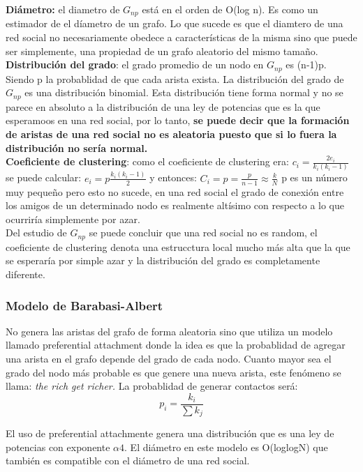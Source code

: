 \documentclass[titlepage,a4paper]{article}
\begin{document}
\textbf{Diámetro:} el diametro de $G_{np}$ está en el orden de O(log n). Es como un estimador de el díametro de un grafo. Lo que sucede es que el diamtero de una red social no necesariamente obedece a características de la misma sino que puede ser simplemente, una propiedad de un grafo aleatorio del mismo tamaño. \\

\textbf{Distribución del grado}: el grado promedio de un nodo en $G_{np}$ es (n-1)p. Siendo p la probablidad de que cada arista exista. La distribución del grado de $G_{np}$ es una distribución binomial. Esta distribución tiene forma normal y no se parece en absoluto a la distribución de una ley de potencias que es la que esperamoos en una red social, por lo tanto, \textbf{se puede decir que la formación de aristas de una red social  no es aleatoria puesto que si lo fuera la distribución no sería normal.}\\

\textbf{Coeficiente de clustering}: como el coeficiente de clustering era: $c_i = \frac{2e_i}{k_i(k_i-1)}$ se puede calcular: $e_i = p \frac{k_i(k_i-1)}{2}$ y entonces: $C_i = p =\frac{p}{n-1} \approx \frac{k}{N}$ p es un número muy pequeño pero esto no sucede, en una red social el grado de conexión entre los amigos de un determinado nodo es realmente altísimo con respecto a lo que ocurriría simplemente por azar. \\

Del estudio de $G_{np}$ se puede concluir que una red social no es random, el coeficiente de clustering denota una estrucctura local mucho más alta que la que se esperaría por simple azar y la distribución del grado es completamente diferente. 

\subsubsection*{Modelo de Barabasi-Albert}
No genera las aristas del grafo de forma aleatoria sino que utiliza un modelo llamado preferential attachment donde la idea es que la probablidad de agregar una arista en el grafo depende del grado de cada nodo. Cuanto mayor sea el grado del nodo más probable es que genere una nueva arista, este fenómeno se llama: \textit{the rich get richer.} La probablidad de generar contactos será:
$$p_i = \frac{k_i}{\sum k_j}$$

El uso de preferential attachmente genera una distribución que es una ley de potencias con exponente $\alpha 4$. El diámetro en este modelo es O(loglogN) que también es compatible con el diámetro de una red social. 
\end{document}
